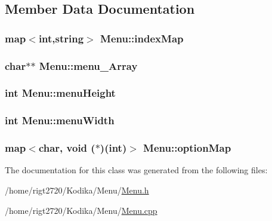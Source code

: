 \subsection{Member Data Documentation}
\hypertarget{classMenu_a18566c84b43074d03f0ad3cacd748aae}{
\subsubsection[{index\-Map}]{\setlength{\rightskip}{0pt plus 5cm}map$<$int,string$>$ Menu\-::index\-Map\hspace{0.3cm}{\ttfamily [protected]}}}\label{classMenu_a18566c84b43074d03f0ad3cacd748aae}
\hypertarget{classMenu_a6fdd29d716c7fb985f038ddde93794a0}{
\subsubsection[{menu\-\_\-\-Array}]{\setlength{\rightskip}{0pt plus 5cm}char$\ast$$\ast$ Menu\-::menu\-\_\-\-Array\hspace{0.3cm}{\ttfamily [protected]}}}\label{classMenu_a6fdd29d716c7fb985f038ddde93794a0}
\hypertarget{classMenu_ad9364e391e91acd266444a2604cb838e}{
\subsubsection[{menu\-Height}]{\setlength{\rightskip}{0pt plus 5cm}int Menu\-::menu\-Height\hspace{0.3cm}{\ttfamily [protected]}}}\label{classMenu_ad9364e391e91acd266444a2604cb838e}
\hypertarget{classMenu_a5c90eda61cd9071dcafda04569dfdd67}{
\subsubsection[{menu\-Width}]{\setlength{\rightskip}{0pt plus 5cm}int Menu\-::menu\-Width\hspace{0.3cm}{\ttfamily [protected]}}}\label{classMenu_a5c90eda61cd9071dcafda04569dfdd67}
\hypertarget{classMenu_a1482795732b18033b8cc3214b4c87176}{
\subsubsection[{option\-Map}]{\setlength{\rightskip}{0pt plus 5cm}map$<$char, void ($\ast$)(int)$>$ Menu\-::option\-Map\hspace{0.3cm}{\ttfamily [protected]}}}\label{classMenu_a1482795732b18033b8cc3214b4c87176}


The documentation for this class was generated from the following files\-:\begin{DoxyCompactItemize}
\item 
/home/rigt2720/\-Kodika/\-Menu/\hyperlink{Menu_8h}{Menu.\-h}\item 
/home/rigt2720/\-Kodika/\-Menu/\hyperlink{Menu_8cpp}{Menu.\-cpp}\end{DoxyCompactItemize}
